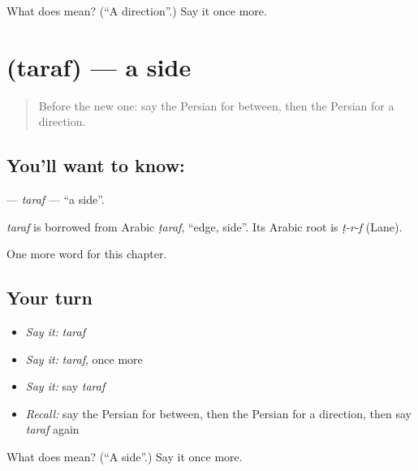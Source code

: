 \begin{tcolorbox}[breakable,colback=teal!4,colframe=teal!35!black,title={Before you move on}]
What does  mean? (\textquotedblleft{}A direction\textquotedblright{}.) Say it once more.
\end{tcolorbox}
\section[\texorpdfstring{\fa{طرف} (taraf)}{طرف (taraf)}]{ (taraf) — a side}

\label{lesson:FA-C86-taraf}



\begin{quote}
Before the new one: say the Persian for between, then the Persian for a direction.
\end{quote}

\subsection*{You'll want to know: }
\textbf{} — \emph{taraf} — \textquotedblleft{}a side\textquotedblright{}.

\begin{cousinweb}
\emph{taraf} is borrowed from Arabic \emph{ṭaraf}, \textquotedblleft{}edge, side\textquotedblright{}. Its Arabic root is \emph{ṭ-r-f} (Lane).
\end{cousinweb}

\begin{grammarlens}[title={What you've built}]
One more word for this chapter.
\end{grammarlens}

\subsection*{Your turn}
\begin{itemize}
\raggedright
  \item \emph{Say it:} \emph{taraf}
  \item \emph{Say it:} \emph{taraf}, once more
  \item \emph{Say it:} say \emph{taraf}
  \item \emph{Recall:} say the Persian for between, then the Persian for a direction, then say \emph{taraf} again
\end{itemize}

\begin{tcolorbox}[breakable,colback=teal!4,colframe=teal!35!black,title={Before you move on}]
What does  mean? (\textquotedblleft{}A side\textquotedblright{}.) Say it once more.
\end{tcolorbox}
